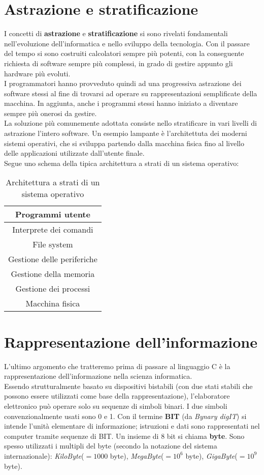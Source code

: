 \section{Astrazione e stratificazione}
I concetti di \textbf{astrazione} e \textbf{stratificazione} si sono rivelati fondamentali nell'evoluzione dell'informatica e nello sviluppo della tecnologia. Con il passare del tempo si sono costruiti calcolatori sempre più potenti, con la conseguente richiesta di software sempre più complessi, in grado di gestire appunto gli hardware più evoluti.\\
I programmatori hanno provveduto quindi ad una progressiva astrazione dei software stessi al fine di trovarsi ad operare su rappresentazioni semplificate della macchina. In aggiunta, anche i programmi stessi hanno iniziato a diventare sempre più onerosi da gestire.\\
La soluzione più comunemente adottata consiste nello stratificare in vari livelli di astrazione l'intero software. Un esempio lampante è l'architettuta dei moderni sistemi operativi, che si sviluppa partendo dalla macchina fisica fino al livello delle applicazioni utilizzate dall'utente finale.\\
Segue uno schema della tipica architettura a strati di un sistema operativo:
\begin{table}[!ht]
	\centering
	\label{Strati-OS}
	\begin{tabular}{c}
		\hline
		Programmi utente           \\ \hline
		Interprete dei comandi     \\ \hline
		File system                \\ \hline
		Gestione delle periferiche \\ \hline
		Gestione della memoria     \\ \hline
		Gestione dei processi      \\ \hline
		Macchina fisica            \\ \hline
	\end{tabular}
\caption{Architettura a strati di un sistema operativo}
\end{table}

\section{Rappresentazione dell'informazione}
L'ultimo argomento che tratteremo prima di passare al linguaggio C è la rappresentazione dell'informazione nella scienza informatica.\\
Essendo strutturalmente basato su dispositivi bistabili (con due stati stabili che possono essere utilizzati come base della rappresentazione), l'elaboratore elettronico può operare solo su sequenze di simboli binari. I due simboli convenzionalmente usati sono 0 e 1. Con il termine \textbf{BIT} (da \textit{Bynary digIT}) si intende l’unità elementare di informazione; istruzioni e dati sono rappresentati nel computer tramite sequenze di BIT. Un insieme di 8 bit si chiama \textbf{byte}. Sono spesso utilizzati i multipli del byte (secondo la notazione del sistema internazionale): \textit{KiloByte}($=1000$ byte), \textit{MegaByte}($=10^{6}$ byte), \textit{GigaByte}($=10^{9}$ byte).


